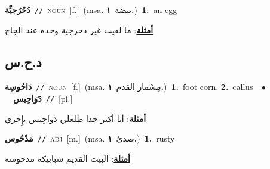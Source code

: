 \documentclass[10pt,a4paper,twoside]{article} %
\begin{document}
\begin{multicols}{2}
{\setlength\topsep{0pt}\textbf{\foreignlanguage{arabic}{دُحْرُجيِّة}}\ {\color{gray}\texttt{//}\color{black}}\ \textsc{noun}\ [f.]\ \color{gray}(msa. \foreignlanguage{arabic}{بيضة}~\foreignlanguage{arabic}{\textbf{١.}})\color{black}\ \textbf{1.}~an egg\  \begin{flushright}\color{gray}\foreignlanguage{arabic}{\textbf{\underline{\foreignlanguage{arabic}{أمثلة}}}: ما لقيت غير دحرجية وحدة عند الجاج}\end{flushright}\color{black}} \vspace{2mm}

\vspace{-3mm}
\subsection*{\color{blue}\foreignlanguage{arabic}{د.ح.س}\color{blue}{}} 

{\setlength\topsep{0pt}\textbf{\foreignlanguage{arabic}{دَاحُوسِة}}\ {\color{gray}\texttt{//}\color{black}}\ \textsc{noun}\ [f.]\ \color{gray}(msa. \foreignlanguage{arabic}{مِسْمار القدم}~\foreignlanguage{arabic}{\textbf{١.}})\color{black}\ \textbf{1.}~foot corn.  \textbf{2.}~callus\ \ $\bullet$\ \ \setlength\topsep{0pt}\textbf{\foreignlanguage{arabic}{دَوَاحِيس}}\ {\color{gray}\texttt{//}\color{black}}\ [pl.]\  \begin{flushright}\color{gray}\foreignlanguage{arabic}{\textbf{\underline{\foreignlanguage{arabic}{أمثلة}}}: أنا أكثر حدا طلعلي دَواحِيس بإِجري}\end{flushright}\color{black}} \vspace{2mm}

{\setlength\topsep{0pt}\textbf{\foreignlanguage{arabic}{مَدْحُوس}}\ {\color{gray}\texttt{//}\color{black}}\ \textsc{adj}\ [m.]\ \color{gray}(msa. \foreignlanguage{arabic}{صدئ}~\foreignlanguage{arabic}{\textbf{١.}})\color{black}\ \textbf{1.}~rusty\  \begin{flushright}\color{gray}\foreignlanguage{arabic}{\textbf{\underline{\foreignlanguage{arabic}{أمثلة}}}: البيت القديم شبابيكه مدحوسة}\end{flushright}\color{black}} \vspace{2mm}


\end{multicols}
\end{document}
